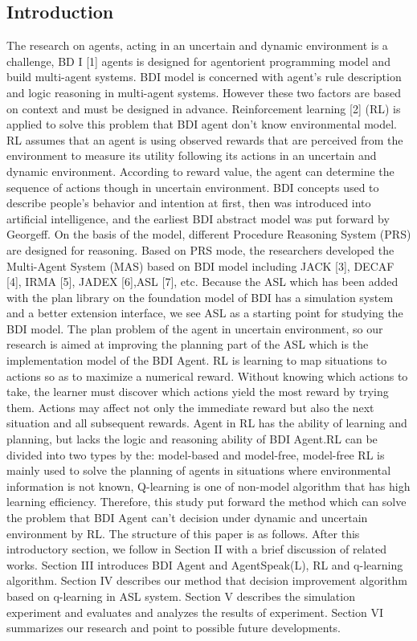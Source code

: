 \documentclass{article}
\begin{document}
\begin{multicols}{2}
\section{Introduction}
The research on agents, acting in an uncertain and dynamic
environment is a challenge, BD I [1] agents is designed for agentorient programming model and build multi-agent systems. BDI
model is concerned with agent’s rule description and logic
reasoning in multi-agent systems. However these two factors are
based on context and must be designed in advance.
Reinforcement learning [2] (RL) is applied to solve this problem
that BDI agent don’t know environmental model. RL assumes
that an agent is using observed rewards that are perceived from
the environment to measure its utility following its actions in an
uncertain and dynamic environment. According to reward value,
the agent can determine the sequence of actions though in
uncertain environment.
BDI concepts used to describe people's behavior and intention
at first, then was introduced into artificial intelligence, and the
earliest BDI abstract model was put forward by Georgeff. On
the basis of the model, different Procedure Reasoning System
(PRS) are designed for reasoning. Based on PRS mode, the
researchers developed the Multi-Agent System (MAS) based on
BDI model including JACK [3], DECAF [4], IRMA [5],
JADEX [6],ASL [7], etc. Because the ASL which has been
added with the plan library on the foundation model of BDI has
a simulation system and a better extension interface, we see
ASL as a starting point for studying the BDI model. The plan
problem of the agent in uncertain environment, so our research
is aimed at improving the planning part of the ASL which is the
implementation model of the BDI Agent.
RL is learning to map situations to actions so as to maximize
a numerical reward. Without knowing which actions to take, the
learner must discover which actions yield the most reward by
trying them. Actions may affect not only the immediate reward
but also the next situation and all subsequent rewards. Agent in
RL has the ability of learning and planning, but lacks the logic
and reasoning ability of BDI Agent.RL can be divided into two
types by the: model-based and model-free, model-free RL is
mainly used to solve the planning of agents in situations where
environmental information is not known, Q-learning is one of
non-model algorithm that has high learning efficiency.
Therefore, this study put forward the method which can solve the
problem that BDI Agent can't decision under dynamic and
uncertain environment by RL.
The structure of this paper is as follows. After this introductory
section, we follow in Section II with a brief discussion of related
works. Section III introduces BDI Agent and AgentSpeak(L), RL
and q-learning algorithm. Section IV describes our method that
decision improvement algorithm based on q-learning in ASL
system. Section V describes the simulation experiment and
evaluates and analyzes the results of experiment. Section VI
summarizes our research and point to possible future developments.


\end{multicols}
\end{document}
